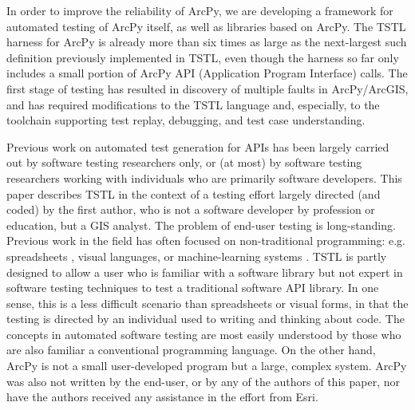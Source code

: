 In order to improve the reliability of ArcPy, we are developing a
framework for automated testing of ArcPy itself, as well as libraries
based on ArcPy.  The TSTL harness for ArcPy is already more than six times as
large as the next-largest such definition previously implemented in
TSTL, even though the harness so far only includes a small portion of ArcPy
API (Application Program Interface) calls. The first stage of testing has resulted in discovery of
multiple faults in ArcPy/ArcGIS, and has required modifications to the
TSTL language and, especially, to the toolchain supporting test replay,
debugging, and test case understanding.




Previous work on automated test generation for APIs has been largely carried
out by software testing researchers only, or (at most) by software
testing researchers working with individuals who are primarily
software developers.  This paper describes TSTL in the context of a
testing effort largely directed (and coded) by the first author, who is not a
software developer by profession or education, but a GIS analyst.
The problem of end-user testing
\cite{burnettEUSE,Silos,rothermelTOSEM} is long-standing.  Previous
work in the field has often focused on
non-traditional programming: e.g. spreadsheets
\cite{rothermelTOSEM}, visual languages, or machine-learning systems
\cite{OnlyOracle}.  TSTL is partly designed to allow a user who is
familiar with a software library but not expert in software testing
techniques to test a traditional software API library.  In one sense,
this is a less difficult scenario than spreadsheets
or visual forms, in that the testing is directed by an individual used
to writing and thinking about code.  The concepts in
automated software testing are most easily understood by those
who are also familiar a conventional
programming language.  On the other hand, ArcPy is
not a small user-developed program but a large, complex system.
ArcPy was also not written by the end-user, or by any of the authors
of this paper, nor have the authors received any assistance in the
effort from Esri.

